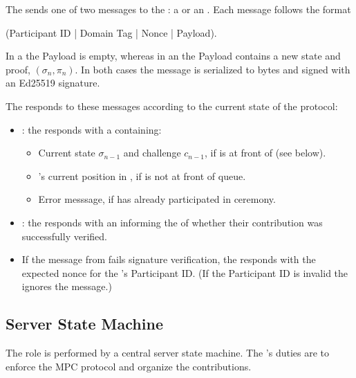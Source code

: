 The \Contributor{} sends one of two messages to the \Coordinator{}: a \QueryRequest{} or an \UpdateRequest{}. Each message follows the format 
\begin{center} 
    (Participant ID | Domain Tag | Nonce | Payload). 
\end{center}
In a \QueryRequest{} the Payload is empty, whereas in an \UpdateRequest{} the Payload contains a new state and proof, $(\sigma_n, \pi_n)$. In both cases the message is serialized to bytes and signed with an Ed25519 signature.

The \Coordinator{} responds to these messages according to the current state of the protocol:
\begin{itemize}
    \item \QueryRequest{}: the \Coordinator{} responds with a \QueryResponse{} containing:
        \begin{itemize}
            \item Current state $\sigma_{n-1}$ and challenge $c_{n-1}$, if \Contributor{} is at front of \Queue{} (see below).
            \item \Contributor{}'s current position in \Queue{}, if \Contributor{} is not at front of queue.
            \item Error messsage, if \Contributor{} has already participated in ceremony.
        \end{itemize}
    \item \UpdateRequest{}: the \Coordinator{} responds with an \UpdateResponse{} informing the \Contributor{} of whether their contribution was successfully verified.
    \item If the message from \Contributor{} fails signature verification, the \Coordinator{} responds with the expected nonce for the \Contributor{}'s Participant ID. (If the Participant ID is invalid the \Coordinator{} ignores the message.)
\end{itemize}

\subsection{Server State Machine}

The \Coordinator{} role is performed by a central server state machine. The \Coordinator{}'s duties are to enforce the MPC protocol and organize the contributions. 

